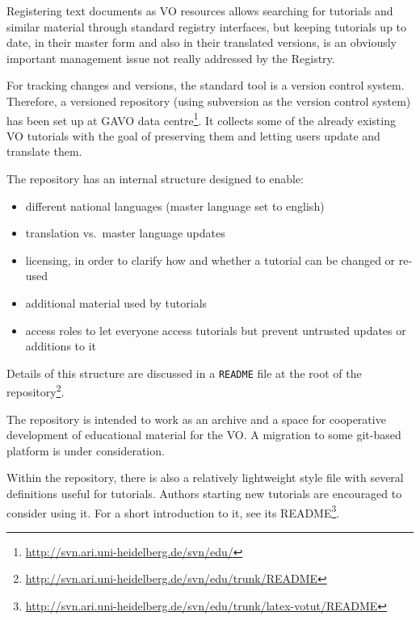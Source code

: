 \documentclass{ivoa}
\begin{document}
\label{sect:svn-repo}

Registering text documents as VO resources allows searching for tutorials
and similar
material through standard registry interfaces, but keeping
tutorials up to date, in their master form and also in their translated
versions, is an obviously important management issue not really
addressed by the Registry.

For tracking changes and versions, the standard tool is a version
control system.  Therefore,
a versioned repository (using subversion as the version control system)
has been set up at GAVO data
centre\footnote{\url{http://svn.ari.uni-heidelberg.de/svn/edu/}}.
It collects some of the
already existing VO tutorials with the goal of preserving them and
letting users
update and translate them.

The repository has an internal structure designed to enable:

\begin{itemize}

\item different national languages (master language set to english){}

\item translation vs.~master language updates{}

\item licensing, in order to clarify how and whether a tutorial can be changed or re-used{}

\item additional material used by tutorials

\item access roles to let everyone access tutorials but prevent untrusted updates or additions to it

\end{itemize}

Details of this structure are discussed in a \texttt{README} file at the
root of the
repository\footnote{\url{http://svn.ari.uni-heidelberg.de/svn/edu/trunk/README}}.

The repository is intended to work as an archive and a space for cooperative
development of educational material for the VO.  A migration to some
git-based platform is under consideration.

Within the repository, there is also a relatively lightweight style file
with several definitions useful for tutorials.  Authors starting new
tutorials are encouraged to consider using it.  For a short introduction
to it, see its README\footnote{\url{http://svn.ari.uni-heidelberg.de/svn/edu/trunk/latex-votut/README}}.
\end{document}
